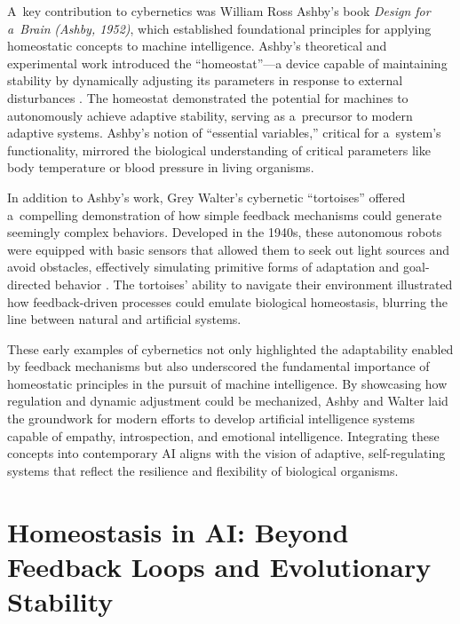 A~key contribution to cybernetics was William Ross Ashby's book \textit{Design for a~Brain} \label{ref:RND4QBhH4WIOz}\textit{(Ashby, 1952)}, which established foundational principles for applying homeostatic concepts to machine intelligence. Ashby's theoretical and experimental work introduced the ``homeostat''---a device capable of maintaining stability by dynamically adjusting its parameters in response to external disturbances 
\parencite[][]{ashby_design_1952}. %
 The homeostat demonstrated the potential for machines to autonomously achieve adaptive stability, serving as a~precursor to modern adaptive systems. Ashby's notion of ``essential variables,'' critical for a~system's functionality, mirrored the biological understanding of critical parameters like body temperature or blood pressure in living organisms.



In addition to Ashby's work, Grey Walter's cybernetic ``tortoises'' offered a~compelling demonstration of how simple feedback mechanisms could generate seemingly complex behaviors. Developed in the 1940s, these autonomous robots were equipped with basic sensors that allowed them to seek out light sources and avoid obstacles, effectively simulating primitive forms of adaptation and goal-directed behavior 
\parencite[][]{walter_imitation_1950}. %
 The tortoises' ability to navigate their environment illustrated how feedback-driven processes could emulate biological homeostasis, blurring the line between natural and artificial systems.



These early examples of cybernetics not only highlighted the adaptability enabled by feedback mechanisms but also underscored the fundamental importance of homeostatic principles in the pursuit of machine intelligence. By showcasing how regulation and dynamic adjustment could be mechanized, Ashby and Walter laid the groundwork for modern efforts to develop artificial intelligence systems capable of empathy, introspection, and emotional intelligence. Integrating these concepts into contemporary AI aligns with the vision of adaptive, self-regulating systems that reflect the resilience and flexibility of biological organisms.



\section*{Homeostasis in AI: Beyond Feedback Loops and Evolutionary Stability}

